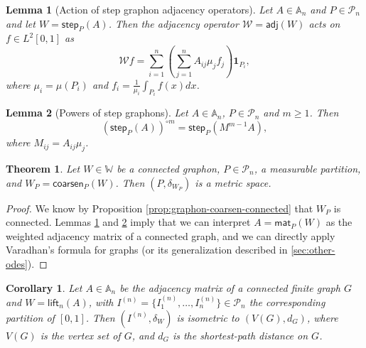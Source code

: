 \documentclass[11pt]{article}
\def\AA{\mathbb{A}}
\def\WW{\mathbb{W}}
\def\II{\bm{1}}
\def\calP{\mathcal{P}}
\def\calW{\mathcal{W}}
\newcommand{\sans}[1]{\mathsf{#1}}
\def\adj{\sans{adj}}
\def\step{\sans{step}}
\def\lift{\sans{lift}}
\def\mat{\sans{mat}}
\def\coarsen{\sans{coarsen}}
\newtheorem{theorem}{Theorem}[section]
\newtheorem{corollary}{Corollary}[section]
\newtheorem{lemma}{Lemma}[section]
\theoremstyle{definition}
\begin{document}
\begin{lemma}[Action of step graphon adjacency operators] \label{lemma:step-graphon-adjacency}
    Let $A\in \AA_n$ and $P \in \calP_n$ and let $W = \step_P (A)$. Then the adjacency operator $\calW = \adj (W)$ acts on $f \in L^2 [0,1]$ as
    $$ \calW f = \sum_{i=1}^n \left( \sum_{j=1}^n A_{ij} \mu_j f_j \right) \II_{P_i}, $$
    where $\mu_i = \mu(P_i)$ and $f_i = \frac{1}{\mu_i} \int_{P_i} f(x) dx$.
\end{lemma}

\begin{lemma}[Powers of step graphons] \label{lemma:step-graphon-powers}
    Let $A \in \AA_n$, $P \in \calP_n$ and $m \ge 1$. Then
    $$ (\step_P(A))^{\circ m} = \step_P (M^{m-1}A), $$
    where $M_{ij} = A_{ij} \mu_j$.
\end{lemma}

\begin{theorem} \label{thm:delta_W-coarsen}
    Let $W\in\WW$ be a connected graphon, $P \in \calP_n$, a measurable partition, and $W_P = \coarsen_P (W)$. Then $(P,\delta_{W_P})$ is a metric space.
\end{theorem}
\begin{proof}
    We know by Proposition \ref{prop:graphon-coarsen-connected} that $W_P$ is connected. Lemmas \ref{lemma:step-graphon-adjacency} and \ref{lemma:step-graphon-powers} imply that we can interpret $A = \mat_P (W)$ as the weighted adjacency matrix of a connected graph, and we can directly apply Varadhan's formula for graphs (or its generalization described in \ref{sec:other-odes}).
\end{proof} 

\begin{corollary} \label{coro:graphon-step-isometry}
    Let $A\in \AA_n$ be the adjacency matrix of a connected finite graph $G$ and $W = \lift_n (A)$, with $I^{(n)} = \{I^{(n)}_1,\dots,I^{(n)}_n\} \in \calP_n$ the corresponding partition of $[0,1]$. Then $(I^{(n)}, \delta_W)$ is isometric to $(V(G),d_G)$, where $V(G)$ is the vertex set of $G$, and $d_G$ is the shortest-path distance on $G$.
\end{corollary}
\end{document}
